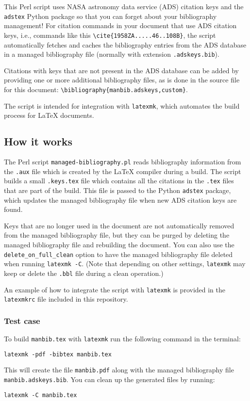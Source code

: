 This Perl script uses NASA astronomy data service (ADS) citation keys and the \texttt{adstex} Python package so that you can forget about your bibliography management! For citation commands in your document that use ADS citation keys, i.e., commands like this 
\texttt{\textbackslash{}cite\{1958ZA.....46..108B\}}, the script automatically fetches and caches the bibliography entries from the ADS database in a managed bibliography file (normally with extension \texttt{.adskeys.bib}).

Citations with keys that are not present in the ADS database can be added by providing one or more additional bibliography files, as is done in the source file for this document: \texttt{\textbackslash{}bibliography\{manbib.adskeys,custom\}}. 

The script is intended for integration with \texttt{latexmk}, which automates the build process for LaTeX documents.

\subsection*{How it works}
The Perl script \texttt{managed-bibliography.pl} reads bibliography information from the \texttt{.aux} file which is created by the LaTeX compiler during a build. The script builds a small \texttt{.keys.tex} file which contains all the citations in the \texttt{.tex} files that are part of the build. This file is passed to the Python \texttt{adstex} package, which updates the managed bibliography file when new ADS citation keys are found. 

Keys that are no longer used in the document are not automatically removed from the managed bibliography file, but they can be purged by deleting the managed bibliography file and rebuilding the document. 
You can also use the \texttt{delete\_on\_full\_clean} option to have the managed bibliography file deleted when running \texttt{latexmk -C}. (Note that depending on other settings, \texttt{latexmk} may keep or delete the \texttt{.bbl} file during a clean operation.)

An example of how to integrate the script with \texttt{latexmk} is provided in the \texttt{latexmkrc} file included in this repository.

\subsubsection*{Test case}
To build \texttt{manbib.tex} with \texttt{latexmk} run the following command in the terminal:
\begin{verbatim}
latexmk -pdf -bibtex manbib.tex
\end{verbatim}
This will create the file \texttt{manbib.pdf} along with the managed bibliography file \texttt{manbib.adskeys.bib}. You can clean up the generated files by running:
\begin{verbatim}
latexmk -C manbib.tex
\end{verbatim}